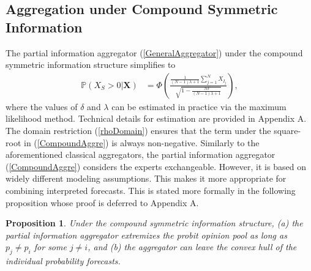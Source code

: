 \documentclass[11pt]{article}
\renewcommand{\P}{\mathbb{P}}
\newtheorem{proposition}[theorem]{Proposition}
\theoremstyle{definition}
\theoremstyle{definition}
\begin{document}
\subsection{Aggregation under Compound Symmetric Information}
\label{compound2}
The partial information aggregator (\ref{GeneralAggregator}) under the compound symmetric information structure simplifies to
\begin{align}
\P\left(X_S > 0 | \boldsymbol{X}\right) &=\Phi\left(\frac{\frac{1}{(N-1)\lambda +1} \sum_{j=1}^N X_{I_j} }{\sqrt{1- \frac{N\delta}{(N-1)\lambda +1} }}  \right), \label{CompoundAggre}
\end{align}
where  the values of $\delta$ and $\lambda$ can be estimated in practice via the maximum likelihood method. Technical details for estimation  are provided in Appendix A.
The domain restriction (\ref{rhoDomain}) ensures that the term under the square-root in (\ref{CompoundAggre}) is always non-negative. Similarly to the aforementioned classical aggregators,  the partial information aggregator (\ref{CompoundAggre}) considers the experts exchangeable. However, it is based on widely different modeling assumptions. This makes it more appropriate for combining interpreted forecasts. This is stated more formally in the following proposition whose proof is deferred to Appendix A. 

\begin{proposition}
\label{positiveThm}
Under the compound symmetric information structure, (a) the partial information aggregator extremizes the probit opinion pool as long as $p_j \neq p_i$ for some $j \neq i$, and (b) the aggregator can leave the convex hull of the individual probability forecasts. 
\end{proposition}
\end{document}
